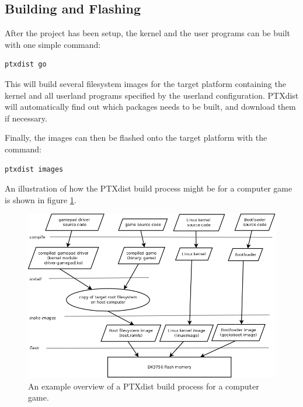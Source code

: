 \subsection{Building and Flashing}
After the project has been setup, the kernel and the user programs can be built with one simple command:
\lstset{style=lststyle-terminal}
\begin{lstlisting}
ptxdist go
\end{lstlisting}
This will build several filesystem images for the target platform containing the kernel and all userland programs specified by the userland configuration. PTXdist will automatically find out which packages needs to be built, and download them if necessary.

Finally, the images can then be flashed onto the target platform with the command:
\lstset{style=lststyle-terminal}
\begin{lstlisting}
ptxdist images
\end{lstlisting}
An illustration of how the PTXdist build process might be for a computer game is shown in figure \ref{fig:ptxdist-build-process}.

\begin{figure}[ht]\label{fig:ptxdist-build-process}
  \includegraphics[width=\textwidth]{images/ptxdist_build_process.png}
  \caption{An example overview of a PTXdist build process for a computer game.}
\end{figure}

